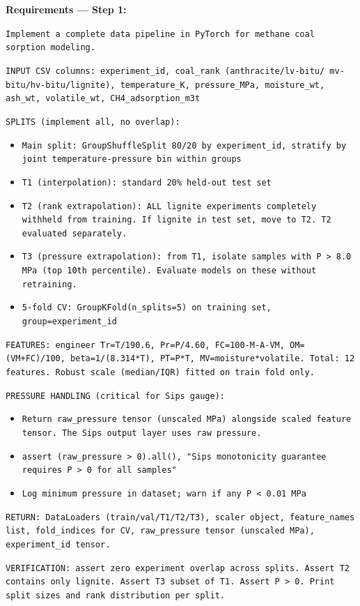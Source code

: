 \documentclass[12pt,a4paper]{article}
\begin{document}
\begin{promptbox}
\textbf{Requirements --- Step 1:}

\texttt{Implement a complete data pipeline in PyTorch for methane coal
sorption modeling.}

\texttt{INPUT CSV columns: experiment\_id, coal\_rank (anthracite/lv-bitu/
mv-bitu/hv-bitu/lignite), temperature\_K, pressure\_MPa, moisture\_wt,
ash\_wt, volatile\_wt, CH4\_adsorption\_m3t}

\texttt{SPLITS (implement all, no overlap):}
\begin{itemize}[noitemsep]
  \item \texttt{Main split: GroupShuffleSplit 80/20 by experiment\_id,
    stratify by joint temperature-pressure bin within groups}
  \item \texttt{T1 (interpolation): standard 20\% held-out test set}
  \item \texttt{T2 (rank extrapolation): ALL lignite experiments
    completely withheld from training. If lignite in test set, move
    to T2. T2 evaluated separately.}
  \item \texttt{T3 (pressure extrapolation): from T1, isolate samples
    with P > 8.0 MPa (top 10th percentile). Evaluate models on these
    without retraining.}
  \item \texttt{5-fold CV: GroupKFold(n\_splits=5) on training set,
    group=experiment\_id}
\end{itemize}

\texttt{FEATURES: engineer Tr=T/190.6, Pr=P/4.60, FC=100-M-A-VM,
OM=(VM+FC)/100, beta=1/(8.314*T), PT=P*T, MV=moisture*volatile.
Total: 12 features. Robust scale (median/IQR) fitted on train fold only.}

\texttt{PRESSURE HANDLING (critical for Sips gauge):}
\begin{itemize}[noitemsep]
  \item \texttt{Return raw\_pressure tensor (unscaled MPa) alongside
    scaled feature tensor. The Sips output layer uses raw pressure.}
  \item \texttt{assert (raw\_pressure > 0).all(), "Sips monotonicity
    guarantee requires P > 0 for all samples"}
  \item \texttt{Log minimum pressure in dataset; warn if any P < 0.01 MPa}
\end{itemize}

\texttt{RETURN: DataLoaders (train/val/T1/T2/T3), scaler object,
feature\_names list, fold\_indices for CV, raw\_pressure tensor
(unscaled MPa), experiment\_id tensor.}

\texttt{VERIFICATION: assert zero experiment overlap across splits.
Assert T2 contains only lignite. Assert T3 subset of T1. Assert P > 0.
Print split sizes and rank distribution per split.}
\end{promptbox}
\end{document}
